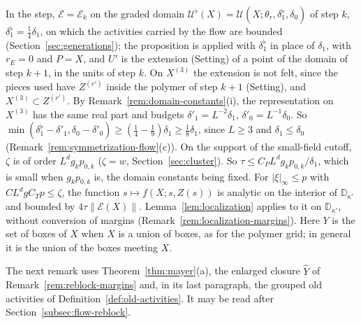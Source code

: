 In the step, $\mathcal E=\mathcal E_k$ on the graded domain $\mathcal U^\flat(X)=\mathcal U(X;\theta_r,\delta_1^\flat,\delta_0)$ of step $k$, $\delta_1^\flat=\frac14\delta_1$, on which the activities carried by the flow are bounded (Section~\ref{sec:generations}); the proposition is applied with $\delta_1^\flat$ in place of $\delta_1$, with $r_E=0$ and $P=X$, and $U'$ is the extension (Setting) of a point of the domain of step $k+1$, in the units of step $k$. On $X^{(3)}$ the extension is not felt, since the pieces used have $Z^{(r')}$ inside the polymer of step $k+1$ (Setting), and $X^{(3)}\subset Z^{(r')}$. By Remark~\ref{rem:domain-constants}(i), the representation on $X^{(3)}$ has the same real part and budgets $\delta'_1=L^{-2}\delta_1$, $\delta'_0=L^{-1}\delta_0$. So $\min(\delta_1^\flat-\delta'_1,\delta_0-\delta'_0)\ge(\frac14-\frac19)\delta_1\ge\frac18\delta_1$, since $L\ge3$ and $\delta_1\le\delta_0$ (Remark~\ref{rem:symmetrization-flow}(c)). On the support of the small-field cutoff, $\zeta$ is of order $L^dg_kp_{0,k}$ ($\zeta=w$, Section~\ref{sec:cluster}). So $\tau\le C_PL^dg_kp_{0,k}/\delta_1$, which is small when $g_kp_{0,k}$ is, the domain constants being fixed. For $|\xi|_\infty\le p$ with $CL^dgC_Tp\le\zeta$, the function $s\mapsto f(X;s,Z(s))$ is analytic on the interior of $\mathbb D_{\kappa'}$ and bounded by $4\tau\|\mathcal E(X)\|$. Lemma~\ref{lem:localization} applies to it on $\mathbb D_{\kappa'}$, without conversion of margins (Remark~\ref{rem:localization-margins}). Here $Y$ is the set of boxes of $X$ when $X$ is a union of boxes, as for the polymer grid; in general it is the union of the boxes meeting $X$.

The next remark uses Theorem~\ref{thm:mayer}(a), the enlarged closure $\hat Y$ of Remark~\ref{rem:reblock-margins} and, in its last paragraph, the grouped old activities of Definition~\ref{def:old-activities}. It may be read after Section~\ref{subsec:flow-reblock}.

